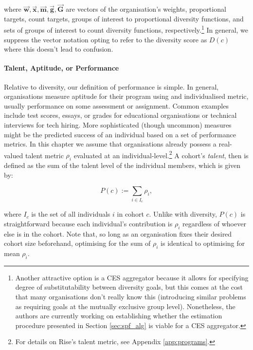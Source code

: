 \noindent where $\vec{\mathbf{w}},\vec{\mathbf{x}}, \vec{\mathbf{m}}, \vec{\mathbf{g}}, \vec{\mathbf{G}}$ are vectors of the organisation's weights, proportional targets, count targets, groups of interest to proportional diversity functions, and sets of groups of interest to count diversity functions, respectively.\footnote{Another attractive option is a CES aggregator because it allows for specifying degree of substitutability between diversity goals, but this comes at the cost that many organisations don't really know this (introducing similar problems as requiring goals at the mutually exclusive group level). Nonetheless, the authors are currently working on establishing whether the estimation procedure presented in Section \ref{sec:spf_alg} is viable for a CES aggregator.} In general, we suppress the vector notation opting to refer to the diversity score as $D(c)$ where this doesn't lead to confusion.

\paragraph{Talent, Aptitude, or Performance} Relative to diversity, our definition of performance is simple. In general, organisations measure aptitude for their program using and individualised metric, usually performance on some assessment or assignment. Common examples include test scores, essays, or grades for educational organisations or technical interviews for tech hiring. More sophisticated (though uncommon) measures might be the predicted success of an individual based on a set of performance metrics. In this chapter we assume that organisations already possess a real-valued talent metric $\rho_i$ evaluated at an individual-level.\footnote{For details on Rise's talent metric, see Appendix \ref{app:programs}.} A cohort's \emph{talent}, then is defined as the sum of the talent level of the individual members, which is given by:

\begin{equation}
P(c) := \sum_{i \in I_c}\rho_i,
\end{equation}

\noindent where $I_c$ is the set of all individuals $i$ in cohort $c$. Unlike with diversity, $P(c)$ is straightforward because each individual's contribution is $\rho_i$ regardless of whoever else is in the cohort. Note that, so long as an organisation fixes their desired cohort size beforehand, optimising for the sum of $\rho_i$ is identical to optimising for mean $\rho_i$.

